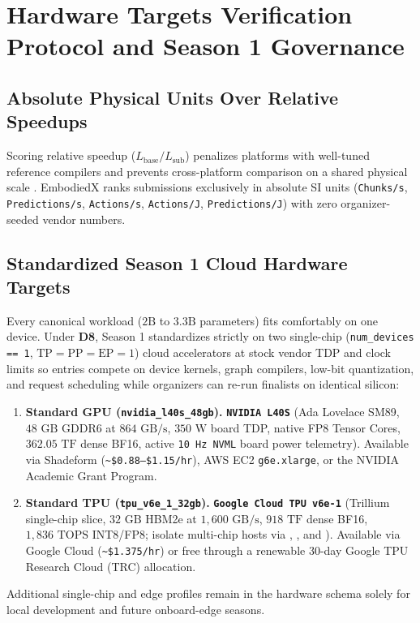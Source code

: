 \documentclass[10pt,letterpaper]{article}
\begin{document}
\FloatBarrier
\section{Hardware Targets Verification Protocol and Season 1 Governance}

\subsection{Absolute Physical Units Over Relative Speedups}
Scoring relative speedup ($L_{\text{base}} / L_{\text{sub}}$) penalizes platforms with well-tuned reference compilers and prevents cross-platform comparison on a shared physical scale \cite{Patel2025inferencemax,Reddi2020mlperf}. EmbodiedX ranks submissions exclusively in absolute SI units (\texttt{Chunks/s}, \texttt{Predictions/s}, \texttt{Actions/s}, \texttt{Actions/J}, \texttt{Predictions/J}) with zero organizer-seeded vendor numbers.

\subsection{Standardized Season 1 Cloud Hardware Targets}
Every canonical workload ($2\text{B}$ to $3.3\text{B}$ parameters) fits comfortably on one device. Under \textbf{D8}, Season 1 standardizes strictly on two single-chip (\texttt{num\_devices == 1}, $\text{TP} = \text{PP} = \text{EP} = 1$) cloud accelerators at stock vendor TDP and clock limits so entries compete on device kernels, graph compilers, low-bit quantization, and request scheduling while organizers can re-run finalists on identical silicon:
\begin{enumerate}
    \item \textbf{Standard GPU (\texttt{nvidia\_l40s\_48gb}).} \textbf{\texttt{NVIDIA L40S}} (Ada Lovelace SM89, $48\text{ GB}$ GDDR6 at $864\text{ GB/s}$, $350\text{ W}$ board TDP, native FP8 Tensor Cores, $362.05\text{ TF}$ dense BF16, active \texttt{10 Hz NVML} board power telemetry). Available via Shadeform (\texttt{\textasciitilde\$0.88--\$1.15/hr}), AWS EC2 \texttt{g6e.xlarge}, or the NVIDIA Academic Grant Program.
    \item \textbf{Standard TPU (\texttt{tpu\_v6e\_1\_32gb}).} \textbf{\texttt{Google Cloud TPU v6e-1}} (Trillium single-chip slice, $32\text{ GB}$ HBM2e at $1{,}600\text{ GB/s}$, $918\text{ TF}$ dense BF16, $1{,}836\text{ TOPS}$ INT8/FP8; isolate multi-chip hosts via , , and ). Available via Google Cloud (\texttt{\textasciitilde\$1.375/hr}) or free through a renewable 30-day Google TPU Research Cloud (TRC) allocation.
\end{enumerate}
Additional single-chip and edge profiles remain in the hardware schema solely for local development and future onboard-edge seasons.
\end{document}
